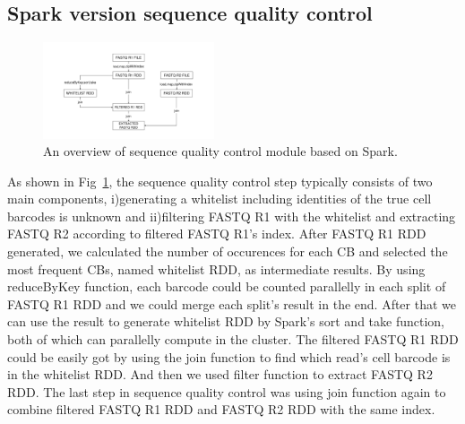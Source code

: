 \documentclass[conference]{IEEEtran}
\begin{document}
\subsection{Spark version sequence quality control}
\begin{figure}
	\includegraphics[width=0.45\textwidth]{Fig1.pdf}
	\caption{An overview of sequence quality control module based on Spark.} \label{fig1}
\end{figure}
As shown in Fig~\ref{fig1}, the sequence quality control step typically consists of two main components, i)generating a whitelist including identities of the true cell barcodes is unknown and ii)filtering FASTQ R1 with the whitelist and extracting FASTQ R2 according to filtered FASTQ R1's index.
After FASTQ R1 RDD generated, we calculated the number of occurences for each CB and selected the most frequent CBs, named whitelist RDD, as intermediate results. 
By using reduceByKey function, each barcode could be counted parallelly in each split of FASTQ R1 RDD and we could merge each split's result in the end. 
After that we can use the result to generate whitelist RDD by Spark's sort and take function, both of which can parallelly compute in the cluster. 
The filtered FASTQ R1 RDD could be easily got by using the join function to find which read's cell barcode is in the whitelist RDD.
And then we used filter function to extract FASTQ R2 RDD. 
The last step in sequence quality control was using join function again to combine filtered FASTQ R1 RDD and FASTQ R2 RDD with the same index. 
\end{document}
